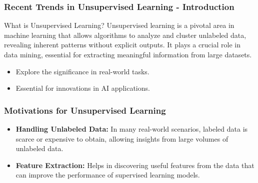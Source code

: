 \documentclass[aspectratio=169]{beamer}
\begin{document}
\begin{frame}[fragile]
    \frametitle{Recent Trends in Unsupervised Learning - Introduction}
    \begin{block}{What is Unsupervised Learning?}
        Unsupervised learning is a pivotal area in machine learning that allows algorithms to analyze and cluster unlabeled data, revealing inherent patterns without explicit outputs. It plays a crucial role in data mining, essential for extracting meaningful information from large datasets.
    \end{block}
    \begin{itemize}
        \item Explore the significance in real-world tasks.
        \item Essential for innovations in AI applications.
    \end{itemize}
\end{frame}

\begin{frame}[fragile]
    \frametitle{Motivations for Unsupervised Learning}
    \begin{itemize}
        \item \textbf{Handling Unlabeled Data:} 
            In many real-world scenarios, labeled data is scarce or expensive to obtain, allowing insights from large volumes of unlabeled data.
        \item \textbf{Feature Extraction:}
            Helps in discovering useful features from the data that can improve the performance of supervised learning models.
    \end{itemize}
\end{frame}
\end{document}
